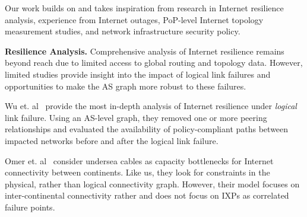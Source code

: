 Our work builds on and takes inspiration from research in Internet resilience
analysis, experience from Internet outages, PoP-level Internet topology
measurement studies, and network infrastructure security policy.

{\bf Resilience Analysis.}
     Comprehensive analysis of Internet resilience remains beyond reach due to
    limited access to global routing and topology data.  However, limited
    studies provide insight into the impact of logical link failures and
    opportunities to make the AS graph more robust to these failures.
    
    Wu et. al~\cite{michigan} provide the most in-depth analysis of Internet
    resilience under {\it logical} link failure.  Using an AS-level graph, they
    removed one or more peering relationships and evaluated the availability of
    policy-compliant paths between impacted networks before and after the
    logical link failure.

    Omer et. al~\cite{measuringresilience} consider undersea cables as capacity
    bottlenecks for Internet connectivity between continents.  Like us, they
    look for constraints in the physical, rather than logical connectivity
    graph.  However, their model focuses on inter-continental connectivity
    rather and does not focus on IXPs as correlated failure points.


